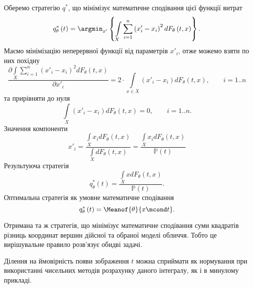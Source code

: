 Оберемо стратегію $q^*$,
що мінімізує математичне сподівання цієї функції витрат
\begin{equation*}
  q^*_{\theta}\left( t \right)
  = \argmin_{x'} \left\{
    \int\limits_{X}
        \sum_{i = 1}^n \left( x'_i - x_i \right)^2
        dF_{\theta}\left( t, x \right)
    \right\}.
\end{equation*}
Маємо мінімізацію неперервної функції від параметрів $x'_i$,
отже можемо взяти по них похідну
\begin{equation*}
  \frac{\partial \int\limits_{X}
      \sum\limits_{i = 1}^n \left( x'_i - x_i \right)^2
      dF_{\theta}\left( t, x \right)
  }{\partial x'_i}
  = 2 \cdot \int\limits_{x \in X} \left( x'_i - x_i \right)
    dF_{\theta}\left( t, x \right), \qquad i = 1..n
\end{equation*}
та прирівняти до нуля
\begin{equation*}
  \int\limits_{X}
    \left( x'_i - x_i \right) dF_{\theta}\left( t, x \right) = 0, \qquad i = 1..n.
\end{equation*}
Значення компоненти
\begin{equation*}
  x'_i
  = \frac{\int\limits_{X} x_i dF_{\theta}\left( t, x \right)}
         {\int\limits_{X} dF_{\theta}\left( t, x \right)}
  = \frac{\int\limits_{X} x_i dF_{\theta}\left( t, x \right)}
         {\mathbb{P}\left( t \right)}
\end{equation*}
Результуюча стратегія
\begin{equation*}
  q^*_{\theta}\left( t \right)
  = \frac{\int\limits_{X} x dF_{\theta}\left( t, x \right)}{\mathbb{P}\left( t \right)}.
\end{equation*}
Оптимальна стратегія як умовне математичне сподівання
\begin{equation*}
  q^*_{\theta}\left( t \right) = \Meanof{\theta}{x \mcond t}.
\end{equation*}

Отримана та ж стратегія,
що мінімізує математичне сподівання суми квадратів різниць
координат вершин дійсної та обраної моделі обличчя.
Тобто це вирішувальне правило розв'язує обидві задачі.

Ділення на ймовірність появи зображення $t$ можна сприймати як нормування
при використанні чисельних методів розрахунку даного інтегралу,
як і в минулому прикладі.
